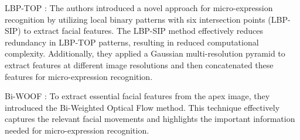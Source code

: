 \documentclass[review,12pt, 3p]{elsarticle}
\begin{document}
LBP-TOP \cite{ref-23}:  The authors introduced a novel approach for micro-expression recognition by utilizing local binary patterns with six intersection points (LBP-SIP) to extract facial features. The LBP-SIP method effectively reduces redundancy in LBP-TOP patterns, resulting in reduced computational complexity. Additionally, they applied a Gaussian multi-resolution pyramid to extract features at different image resolutions and then concatenated these features for micro-expression recognition. 

Bi-WOOF \cite{ref-24}: To extract essential facial features from the apex image, they introduced the Bi-Weighted Optical Flow method. This technique effectively captures the relevant facial movements and highlights the important information needed for micro-expression recognition.
\end{document}
